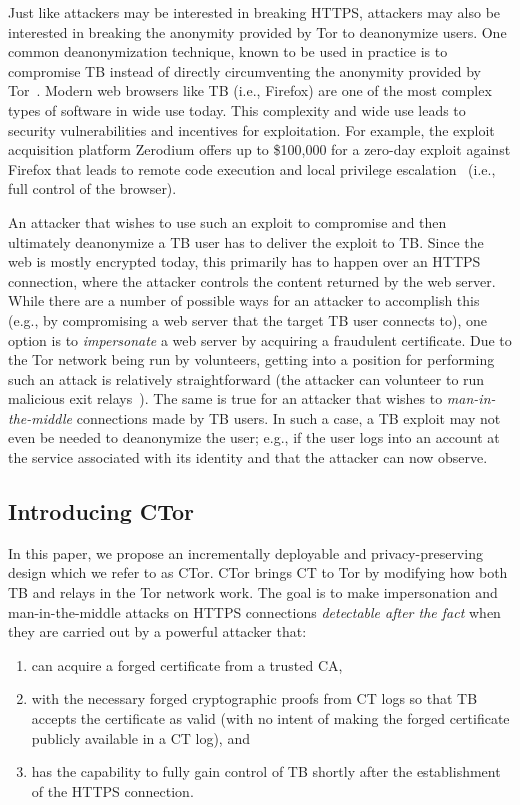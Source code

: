 Just like attackers may be interested in breaking HTTPS, attackers may also be
interested in breaking the anonymity provided by Tor to deanonymize users. One
common deanonymization technique, known to be used in practice is to compromise
TB instead of directly circumventing the anonymity provided by
Tor~\cite{selfrando,lepop1,lepop2,zerotor}. Modern web browsers like TB (i.e.,
Firefox) are one of the most complex types of software in wide use today. This
complexity and wide use leads to security vulnerabilities and incentives for
exploitation. For example, the exploit acquisition platform Zerodium offers up
to \$100,000 for a zero-day exploit against Firefox that leads to remote code
execution and local privilege escalation~\cite{zeromain} (i.e., full control of
the browser).

An attacker that wishes to use such an exploit to compromise and then ultimately
deanonymize a TB user has to deliver the exploit to TB\@. Since the web is
mostly encrypted today, this primarily has to happen over an HTTPS connection,
where the attacker controls the content returned by the web server. While there
are a number of possible ways for an attacker to accomplish this (e.g., by
compromising a web server that the target TB user connects to), one option is to
\emph{impersonate} a web server by acquiring a fraudulent certificate. Due to
the Tor network being run by volunteers, getting into a position for performing
such an attack is relatively straightforward (the attacker can volunteer to run
malicious exit relays~\cite{spoiled-onions}). The same is true for an attacker that
wishes to \emph{man-in-the-middle} connections made by TB users. In such a case,
a TB exploit may not even be needed to deanonymize the user; e.g., if the user
logs into an account at the service associated with its identity and that the
attacker can now observe.

\subsection{Introducing CTor}
In this paper, we propose an incrementally deployable and privacy-preserving
design which we refer to as CTor. CTor brings CT to Tor by modifying how both TB
and relays in the Tor network work. The goal is to make impersonation and
man-in-the-middle attacks on HTTPS connections \emph{detectable after the fact}
when they are carried out by a powerful attacker that:
\begin{enumerate}
	\item can acquire a forged certificate from a trusted CA,
	\item with the necessary forged cryptographic proofs from CT logs so that TB
	accepts the certificate as valid (with no intent of making the forged
	certificate publicly available in a CT log), and
	\item has the capability to fully gain control of TB shortly after the
	establishment of the HTTPS connection.
\end{enumerate}

